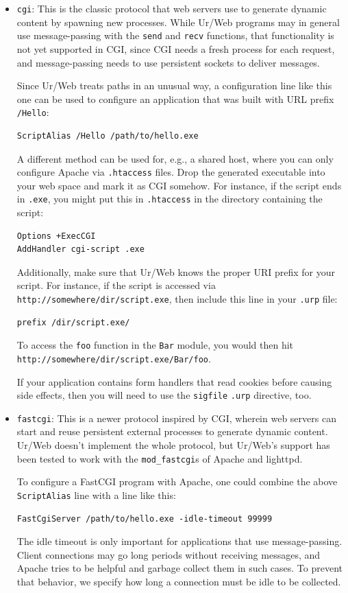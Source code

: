 \documentclass{article}
\begin{document}
\begin{itemize}
\begin{itemize}
  \item \texttt{cgi}: This is the classic protocol that web servers use to generate dynamic content by spawning new processes.  While Ur/Web programs may in general use message-passing with the \texttt{send} and \texttt{recv} functions, that functionality is not yet supported in CGI, since CGI needs a fresh process for each request, and message-passing needs to use persistent sockets to deliver messages.

    Since Ur/Web treats paths in an unusual way, a configuration line like this one can be used to configure an application that was built with URL prefix \texttt{/Hello}:
    \begin{verbatim}
ScriptAlias /Hello /path/to/hello.exe
    \end{verbatim}

    A different method can be used for, e.g., a shared host, where you can only configure Apache via \texttt{.htaccess} files.  Drop the generated executable into your web space and mark it as CGI somehow.  For instance, if the script ends in \texttt{.exe}, you might put this in \texttt{.htaccess} in the directory containing the script:
    \begin{verbatim}
Options +ExecCGI
AddHandler cgi-script .exe
    \end{verbatim}

    Additionally, make sure that Ur/Web knows the proper URI prefix for your script.  For instance, if the script is accessed via \texttt{http://somewhere/dir/script.exe}, then include this line in your \texttt{.urp} file:
    \begin{verbatim}
prefix /dir/script.exe/
    \end{verbatim}

    To access the \texttt{foo} function in the \texttt{Bar} module, you would then hit \texttt{http://somewhere/dir/script.exe/Bar/foo}.

    If your application contains form handlers that read cookies before causing side effects, then you will need to use the \texttt{sigfile} \texttt{.urp} directive, too.

  \item \texttt{fastcgi}: This is a newer protocol inspired by CGI, wherein web servers can start and reuse persistent external processes to generate dynamic content.  Ur/Web doesn't implement the whole protocol, but Ur/Web's support has been tested to work with the \texttt{mod\_fastcgi}s of Apache and lighttpd.

    To configure a FastCGI program with Apache, one could combine the above \texttt{ScriptAlias} line with a line like this:
    \begin{verbatim}
FastCgiServer /path/to/hello.exe -idle-timeout 99999
    \end{verbatim}
    The idle timeout is only important for applications that use message-passing.  Client connections may go long periods without receiving messages, and Apache tries to be helpful and garbage collect them in such cases.  To prevent that behavior, we specify how long a connection must be idle to be collected.


\end{itemize}
\end{itemize}
\end{document}
